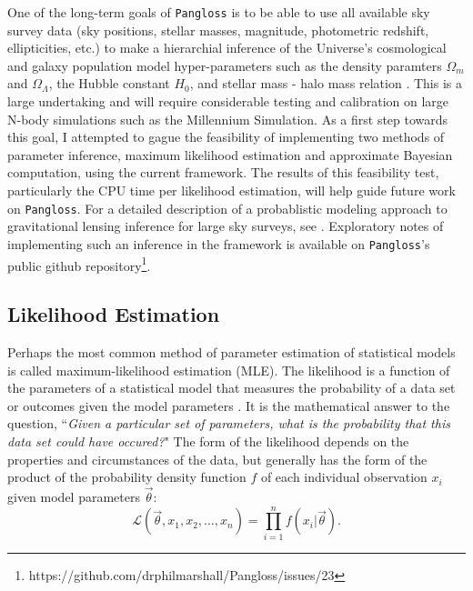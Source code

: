 \documentclass[%
 reprint,
 amsmath,amssymb,
 aps,nofootinbib
]{revtex4-1}
\begin{document}
One of the long-term goals of \texttt{Pangloss} is to be able to use all available sky survey data (sky positions, stellar masses, magnitude, photometric redshift, ellipticities, etc.) to make a hierarchial inference of the Universe's cosmological and galaxy population model hyper-parameters such as the density paramters $\Omega_m$ and $\Omega_\Lambda$, the Hubble constant $H_0$, and stellar mass - halo mass relation \cite{smhr}. This is a large undertaking and will require considerable testing and calibration on large N-body simulations such as the Millennium Simulation. As a first step towards this goal, I attempted to gague the feasibility of implementing two methods of parameter inference, maximum likelihood estimation and approximate Bayesian computation, using the current framework. The results of this feasibility test, particularly the CPU time per likelihood estimation, will help guide future work on \texttt{Pangloss}. For a detailed description of a probablistic modeling approach to gravitational lensing inference for large sky surveys, see \cite{hierarchial_inference}. Exploratory notes of implementing such an inference in the framework is available on \texttt{Pangloss}'s public github repository\footnote{https://github.com/drphilmarshall/Pangloss/issues/23}.\\


\subsection{Likelihood Estimation} \label{mle}

Perhaps the most common method of parameter estimation of statistical models is called maximum-likelihood estimation (MLE). The likelihood is a function of the parameters of a statistical model that measures the probability of a data set or outcomes given the model parameters \cite{bayes_in_sky}. It is the mathematical answer to the question, ``\textit{Given a particular set of parameters, what is the probability that this data set could have occured?}" The form of the likelihood depends on the properties and circumstances of the data, but generally has the form of the product of the probability density function $f$ of each individual observation $x_i$ given model parameters $\vec{\theta}$:
\begin{equation}
\mathcal{L}(\vec{\theta},x_1,x_2,\ldots,x_n)=\prod_{i=1}^nf(x_i|\vec{\theta}).
\end{equation}
\end{document}
